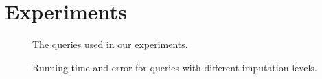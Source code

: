 \section{Experiments}

\begin{figure}
  
  \caption{The queries used in our experiments.}
\end{figure}

\begin{figure}
  
  \caption{Running time and error for queries with different imputation levels.}
\end{figure}

